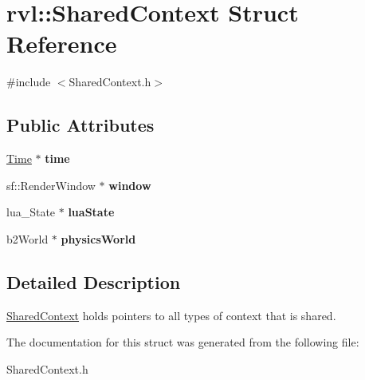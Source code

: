 \hypertarget{structrvl_1_1_shared_context}{}\section{rvl\+:\+:Shared\+Context Struct Reference}
\label{structrvl_1_1_shared_context}


{\ttfamily \#include $<$Shared\+Context.\+h$>$}

\subsection*{Public Attributes}
\begin{DoxyCompactItemize}
\item 
\mbox{\label{structrvl_1_1_shared_context_aa7cc22c51d90b03ebb095f204d138795}} 
\hyperlink{classrvl_1_1_time}{Time} $\ast$ {\bfseries time}
\item 
\mbox{\label{structrvl_1_1_shared_context_a616231b97cd2354f155598b77d76508d}} 
sf\+::\+Render\+Window $\ast$ {\bfseries window}
\item 
\mbox{\label{structrvl_1_1_shared_context_a1011cf18940500204eecc4b4995a6bad}} 
lua\+\_\+\+State $\ast$ {\bfseries lua\+State}
\item 
\mbox{\label{structrvl_1_1_shared_context_a6b2bbf356b1315eed46db97a49a9e559}} 
b2\+World $\ast$ {\bfseries physics\+World}
\end{DoxyCompactItemize}


\subsection{Detailed Description}
\hyperlink{structrvl_1_1_shared_context}{Shared\+Context} holds pointers to all types of context that is shared. 

The documentation for this struct was generated from the following file\+:\begin{DoxyCompactItemize}
\item 
Shared\+Context.\+h\end{DoxyCompactItemize}
